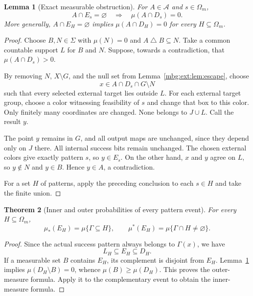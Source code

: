 \documentclass[11pt,letterpaper]{article}
\newtheorem{theorem}{Theorem}[section]
\newtheorem{lemma}[theorem]{Lemma}
\theoremstyle{definition}
\newcommand{\A}{\mathcal A}
\newcommand{\cyl}{\Sigma}
\begin{document}
\begin{lemma}[Exact measurable obstruction]
\label{mbg:ext:lem:envelope}
For $A\in\A$ and $s\in\Omega_m$,
\begin{equation}
A\cap E_s=\varnothing\quad\Longrightarrow\quad
\mu(A\cap D_s)=0.
\label{mbg:ext:eq:envelope}
\end{equation}
More generally, $A\cap E_H=\varnothing$ implies $\mu(A\cap D_H)=0$ for every $H\subseteq\Omega_m$.
\end{lemma}
\begin{proof}
Choose $B,N\in\cyl$ with $\mu(N)=0$ and $A\mathbin\triangle B\subseteq N$. Take a common countable support $L$ for $B$ and $N$. Suppose, towards a contradiction, that $\mu(A\cap D_s)>0$.

By removing $N$, $X\setminus G$, and the null set from Lemma~\ref{mbg:ext:lem:escape}, choose
\[
x\in A\cap D_s\cap G\setminus N
\]
such that every selected external target lies outside $L$. For each external target group, choose a color witnessing feasibility of $s$ and change that box to this color. Only finitely many coordinates are changed. None belongs to $J\cup L$. Call the result $y$.

The point $y$ remains in $G$, and all output maps are unchanged, since they depend only on $J$ there. All internal success bits remain unchanged. The chosen external colors give exactly pattern $s$, so $y\in E_s$. On the other hand, $x$ and $y$ agree on $L$, so $y\notin N$ and $y\in B$. Hence $y\in A$, a contradiction.

For a set $H$ of patterns, apply the preceding conclusion to each $s\in H$ and take the finite union.
\end{proof}

\begin{theorem}[Inner and outer probabilities of every pattern event]
\label{mbg:ext:thm:envelopes}
For every $H\subseteq\Omega_m$,
\begin{equation}
\boxed{\quad
\mu_*(E_H)=\mu\{\Gamma\subseteq H\},\qquad
\mu^*(E_H)=\mu\{\Gamma\cap H\ne\varnothing\}.
\quad}
\label{mbg:ext:eq:innerouter}
\end{equation}
\end{theorem}
\begin{proof}
Since the actual success pattern always belongs to $\Gamma(x)$, we have
\[
L_H\subseteq E_H\subseteq D_H.
\]
If a measurable set $B$ contains $E_H$, its complement is disjoint from $E_H$. Lemma~\ref{mbg:ext:lem:envelope} implies $\mu(D_H\setminus B)=0$, whence $\mu(B)\ge\mu(D_H)$. This proves the outer-measure formula. Apply it to the complementary event to obtain the inner-measure formula.
\end{proof}
\end{document}
